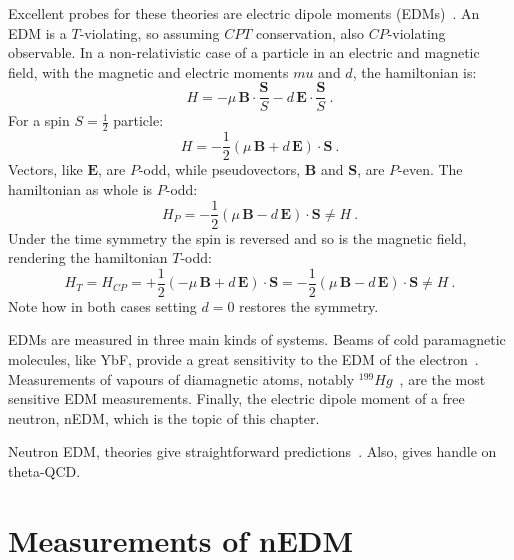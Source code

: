 Excellent probes for these theories are electric dipole moments (EDMs)~\cite{Pospelov2005}. An EDM is a $T$-violating, so assuming $CPT$ conservation, also $CP$-violating observable. In a non-relativistic case of a particle in an electric and magnetic field, with the magnetic and electric moments $mu$ and $d$, the hamiltonian is:
\begin{equation}
  H = - \mu \, \bm{B} \cdot \frac{\bm{S}}{S} - d \, \bm{E} \cdot \frac{\bm{S}}{S} \ .
\end{equation}
For a spin $S = \frac{1}{2}$ particle:
\begin{equation}
  H = - \frac{1}{2} \left( \mu \, \bm{B} + d \, \bm{E} \right ) \cdot \bm{S} \ .
\end{equation}
Vectors, like $\bm{E}$, are $P$-odd, while pseudovectors, $\bm{B}$ and $\bm{S}$, are $P$-even. The hamiltonian as whole is $P$-odd:
\begin{equation}
  H_P = - \frac{1}{2} \left( \mu \, \bm{B} - d \, \bm{E} \right ) \cdot \bm{S} \neq H \ .
\end{equation}
Under the time symmetry the spin is reversed and so is the magnetic field, rendering the hamiltonian $T$-odd:
\begin{equation}
  H_T = H_{CP} = + \frac{1}{2} \left( - \mu \, \bm{B} + d \, \bm{E} \right ) \cdot \bm{S} = - \frac{1}{2} \left( \mu \, \bm{B} - d \, \bm{E} \right ) \cdot \bm{S} \neq H \ .
\end{equation}
Note how in both cases setting $d = 0$ restores the symmetry.

EDMs are measured in three main kinds of systems. Beams of cold paramagnetic molecules, like YbF, provide a great sensitivity to the EDM of the electron~\cite{Hudson2011}. Measurements of vapours of diamagnetic atoms, notably $^{199}Hg$~\cite{PhysRevLett.116.161601}, are the most sensitive EDM measurements. Finally, the electric dipole moment of a free neutron, nEDM, which is the topic of this chapter.

Neutron EDM, theories give straightforward predictions~\cite{Ellis1989}. Also, gives handle on theta-QCD.



\section{Measurements of nEDM}

